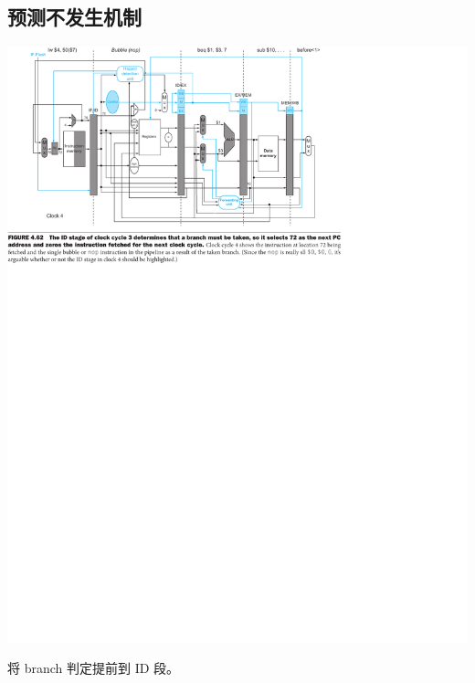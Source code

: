 \documentclass[a4paper,UTF8]{ctexart}
\begin{document}
\subsection{预测不发生机制}

\includegraphics[width=\textwidth]{predict-not-taken.pdf}

将 branch 判定提前到 ID 段。
\end{document}
